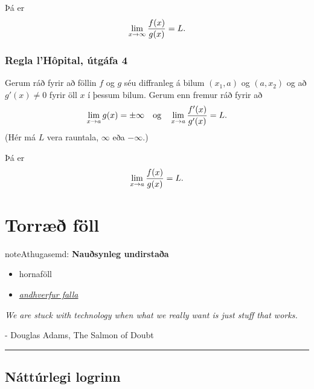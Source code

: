 \documentclass[a4paper,10pt,icelandic]{sphinxmanual}
\begin{document}
Þá er
\begin{gather}
\begin{split}\lim_{x\rightarrow \infty}\frac{f(x)}{g(x)}=L.\end{split}\notag
\end{gather}

\subsection{Regla l’Hôpital, útgáfa 4}
\label{kafli03:regla-lhopital-utgafa-4}
Gerum ráð fyrir að föllin \(f\) og \(g\) séu diffranleg á bilum
\((x_1, a)\) og \((a, x_2)\) og að \(g'(x)\neq 0\) fyrir öll
\(x\) í þessum bilum. Gerum enn fremur ráð fyrir að
\begin{gather}
\begin{split}\lim_{x\rightarrow a}g(x)=\pm\infty
\quad\mbox{og}\quad \lim_{x\rightarrow a}\frac{f'(x)}{g'(x)}=L.\end{split}\notag
\end{gather}
(Hér má \(L\) vera rauntala, \(\infty\) eða \(-\infty\).)

Þá er
\begin{gather}
\begin{split}\lim_{x\rightarrow a}\frac{f(x)}{g(x)}=L.\end{split}\notag
\end{gather}

\chapter{Torræð föll}
\label{kafli04::doc}\label{kafli04:torrae-foll}
\begin{notice}{note}{Athugasemd:}
\textbf{Nauðsynleg undirstaða}
\begin{itemize}
\item {} 
hornaföll

\item {} 
{\hyperref[kafli01:andhverfa]{\emph{andhverfur falla}}}

\end{itemize}
\end{notice}

\emph{We are stuck with technology when what we really want is just stuff that works.}

- Douglas Adams, The Salmon of Doubt


\bigskip\hrule{}\bigskip



\section{Náttúrlegi logrinn}
\label{kafli04:natturlegi-logrinn}
\end{document}
